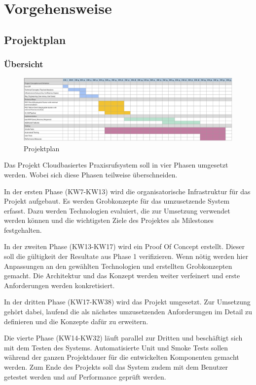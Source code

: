 \section{Vorgehensweise}\label{sec:vorgehensweise}

\subsection{Projektplan}\label{subsec:projektplan}

\subsubsection*{Übersicht}
\begin{figure}[h]
    \label{fig:projectPlan}
    \includegraphics[width=\linewidth]{graphics/Projectplanning}\caption[Projektplan]{Projektplan}
\end{figure}

Das Projekt Cloudbasiertes Praxisrufsystem soll in vier Phasen umgesetzt werden.
Wobei sich diese Phasen teilweise überschneiden.

In der ersten Phase (KW7-KW13) wird die organisatorische Infrastruktur für das Projekt aufgebaut.
Es werden Grobkonzepte für das umzusetzende System erfasst.
Dazu werden Technologien evaluiert, die zur Umsetzung verwendet werden können und
die wichtigsten Ziele des Projektes als Milestones festgehalten.

In der zweiten Phase (KW13-KW17) wird ein Proof Of Concept erstellt.
Dieser soll die gültigkeit der Resultate aus Phase 1 verifizieren.
Wenn nötig werden hier Anpassungen an den gewählten Technologien und erstellten Grobkonzepten gemacht.
Die Architektur und das Konzept werden weiter verfeinert und erste Anforderungen werden konkretisiert.

In der dritten Phase (KW17-KW38) wird das Projekt umgesetzt.
Zur Umsetzung gehört dabei, laufend die als nächstes umzusetzenden Anforderungen im Detail zu definieren und die Konzepte dafür zu erweitern.

Die vierte Phase (KW14-KW32) läuft parallel zur Dritten und beschäftigt sich mit dem Testen des Systems.
Automatisierte Unit und Smoke Tests sollen während der ganzen Projektdauer für die entwickelten Komponenten gemacht werden.
Zum Ende des Projekts soll das System zudem mit dem Benutzer getestet werden und auf Performance geprüft werden.

